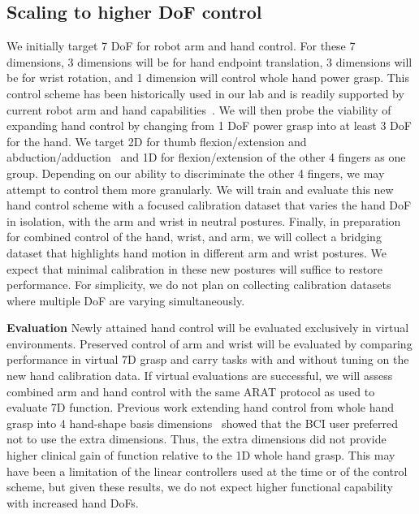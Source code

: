 \documentclass[12pt,oneside]{report}
\begin{document}
\subsection{Scaling to higher DoF control}
We initially target 7 DoF for robot arm and hand control. For these 7 dimensions, 3 dimensions will be for hand endpoint translation, 3 dimensions will be for wrist rotation, and 1 dimension will control whole hand power grasp. This control scheme has been historically used in our lab and is readily supported by current robot arm and hand capabilities~\citep{collinger2013high}. We will then probe the viability of expanding hand control by changing from 1 DoF power grasp into at least 3 DoF for the hand. We target 2D for thumb flexion/extension and abduction/adduction~\citep{willsey2024real} and 1D for flexion/extension of the other 4 fingers as one group. Depending on our ability to discriminate the other 4 fingers, we may attempt to control them more granularly. We will train and evaluate this new hand control scheme with a focused calibration dataset that varies the hand DoF in isolation, with the arm and wrist in neutral postures. Finally, in preparation for combined control of the hand, wrist, and arm, we will collect a bridging dataset that highlights hand motion in different arm and wrist postures. We expect that minimal calibration in these new postures will suffice to restore performance. For simplicity, we do not plan on collecting calibration datasets where multiple DoF are varying simultaneously.

\textbf{Evaluation} Newly attained hand control will be evaluated exclusively in virtual environments. Preserved control of arm and wrist will be evaluated by comparing performance in virtual 7D grasp and carry tasks with and without tuning on the new hand calibration data. If virtual evaluations are successful, we will assess combined arm and hand control with the same ARAT protocol as used to evaluate 7D function. Previous work extending hand control from whole hand grasp into 4 hand-shape basis dimensions~\citep{wodlinger_15_10d} showed that the BCI user preferred not to use the extra dimensions. Thus, the extra dimensions did not provide higher clinical gain of function relative to the 1D whole hand grasp. This may have been a limitation of the linear controllers used at the time or of the control scheme, but given these results, we do not expect higher functional capability with increased hand DoFs.
\end{document}
